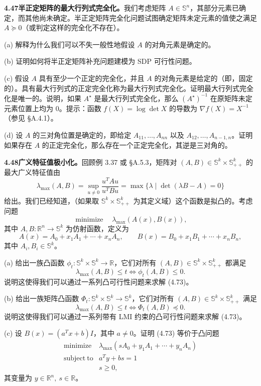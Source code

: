 \documentclass[UTF8,12pt,a4paper,fontset=fandol]{ctexart}
\begin{document}
\noindent\textbf{4.47\quad 半正定矩阵的最大行列式完全化。}\quad 我们考虑矩阵 $A\in\mathbb{S}^n$，其部分元素已确定，而其他尚未确定。半正定矩阵完全化问题试图确定矩阵未定元素的值使之满足 $A\succeq0$（或判定这样的完全化不存在）。

(a) 解释为什么我们可以不失一般性地假设 $A$ 的对角元素是确定的。

(b) 证明如何将半正定矩阵补充问题建模为 SDP 可行性问题。

(c) 假设 $A$ 具有至少一个正定的完全化，并且 $A$ 的对角元素是给定的（即，固定的）。具有最大行列式的正定完全化称为最大行列式完全化。证明最大行列式完全化是唯一的。说明，如果 $A^\star$ 是最大行列式完全化，那么 $(A^\star)^{-1}$ 在原矩阵未定元素位置上均为 0。提示：函数 $f(X)=\log\det X$ 的导数为 $\nabla f(X)=X^{-1}$（参见 \S A.4.1）。

(d) 设 $A$ 的三对角位置是确定的，即给定 $A_{11},\ldots,A_{nn}$ 以及 $A_{12},\ldots,A_{n-1,n}$。证明如果存在 $A$ 的正定完全化，那么存在一个正定完全化，其逆是三对角的。

\noindent\textbf{4.48\quad 广义特征值极小化。}\quad 回顾例 3.37 或 \S A.5.3，矩阵对 $(A,B)\in\mathbb{S}^k\times\mathbb{S}_{++}^k$ 的最大广义特征值由
\[
\lambda_{\max}(A,B)=\sup_{u\neq0}\frac{u^TAu}{u^TBu}=\max\{\lambda\mid \det(\lambda B-A)=0\}
\]
给出。我们已经知道，（如果取 $\mathbb{S}^k\times\mathbb{S}_{++}^k$ 为其定义域）这个函数是拟凸的。考虑问题
\[
\mathop{\mathrm{minimize}}\quad \lambda_{\max}(A(x),B(x)),
\tag{4.73}
\]
其中 $A,B:\mathbb{R}^n\to\mathbb{S}^k$ 为仿射函数，定义为
\[
A(x)=A_0+x_1A_1+\cdots+x_nA_n,\qquad B(x)=B_0+x_1B_1+\cdots+x_nB_n,
\]
其中 $A_i,B_i\in\mathbb{S}^k$。

(a) 给出一族凸函数 $\phi_t:\mathbb{S}^k\times\mathbb{S}^k\to\mathbb{R}$，它们对所有 $(A,B)\in\mathbb{S}^k\times\mathbb{S}_{++}^k$ 都满足
\[
\lambda_{\max}(A,B)\leq t\Longleftrightarrow \phi_t(A,B)\leq0.
\]
说明这使得我们可以通过一系列凸可行性问题来求解 (4.73)。

(b) 给出一族矩阵凸函数 $\Phi_t:\mathbb{S}^k\times\mathbb{S}^k\to\mathbb{S}^k$，它们对所有 $(A,B)\in\mathbb{S}^k\times\mathbb{S}_{++}^k$ 满足
\[
\lambda_{\max}(A,B)\leq t\Longleftrightarrow \Phi_t(A,B)\preceq0.
\]
说明这使得我们可以通过一系列带有 LMI 约束的凸可行性问题来求解 (4.73)。

(c) 设 $B(x)=(a^Tx+b)I$，其中 $a\neq0$。证明 (4.73) 等价于凸问题
\[
\begin{array}{ll}
\mathop{\mathrm{minimize}} & \lambda_{\max}(sA_0+y_1A_1+\cdots+y_nA_n)\\
\mathrm{subject\ to} & a^Ty+bs=1\\
& s\geq0,
\end{array}
\]
其变量为 $y\in\mathbb{R}^n,\ s\in\mathbb{R}$。
\end{document}
